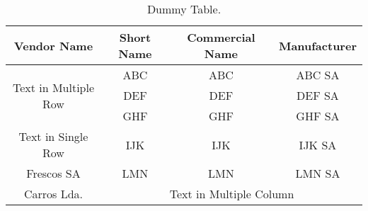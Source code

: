 \begin{table}[H]
	\centering
	\caption{Dummy Table.}
	\begin{tabular}{|c|c|c|c|} \hline
		\textbf{Vendor Name} 				& \textbf{Short Name}	& \textbf{Commercial Name}	& \textbf{Manufacturer}	\\ \hline \hline
		\multirow{3}{*}{Text in Multiple Row}		&	ABC				&  ABC\textreg				& ABC SA			         \\ \cline{2-4}
		 								&        DEF				&  DEF\textreg				& DEF SA				\\ \cline{2-4}
										&        GHF			&  GHF\textreg				& GHF SA				\\ \hline
		Text in Single Row					&        IJK				& IJK\textreg				& IJK SA				\\ \hline
		Frescos SA						&        LMN			& LMN\textreg				& LMN SA				\\ \hline
		Carros Lda.						&    \multicolumn{3}{|c|}{Text in Multiple Column}							\\ \hline
	\end{tabular}
	\label{tab:dummytable}
\end{table}